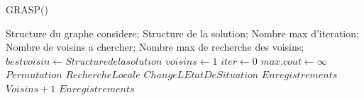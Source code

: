 \documentclass[11pt]{ctexart}
\begin{document}
\renewcommand{\thealgorithm}{} %
    \begin{algorithm}
        \caption{GRASP()} %
        \begin{algorithmic}[1] %
            \Require Structure du graphe considere;
                    Structure de la solution;
                    Nombre max d'iteration;
                    Nombre de voisins a chercher;
                    Nombre max de recherche des voisins;
                \State $best voisin \leftarrow Structure de la solution$
                \State $voisins \leftarrow 1$
                \State $iter \leftarrow 0$
                \State $max.cout \leftarrow \infty$
                    \State $Permutation$
                    \State $RechercheLocale$
                        \State $ChangeLEtatDeSituation$
                            \State $Enregistrements$
                        \EndIf
                        \State $Voisins + 1$
                    \EndIf
                    \State $Enregistrements$
                \EndIf
                \EndIf
            \EndFor
        \end{algorithmic}
    \end{algorithm}
\end{document}

